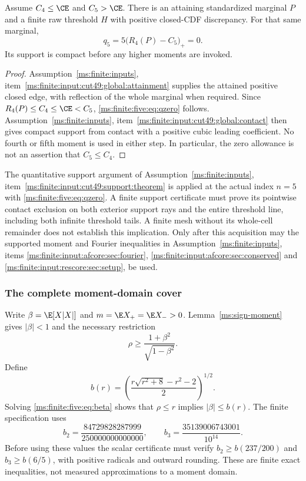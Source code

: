 \begin{lemma}\label{ms:finite:five:lem:qzero}
Assume $C_4\le\CE$ and $C_5>\CE$. There is an attaining standardized
marginal $P$ and a finite raw threshold $H$ with positive closed-CDF
discrepancy. For that same marginal,
\begin{equation}\label{ms:finite:five:eq:qzero}
 q_5=5\bigl(R_4(P)-C_5\bigr)_+=0.
\end{equation}
Its support is compact before any higher moments are invoked.
\end{lemma}
\begin{proof}
Assumption~\ref{ms:finite:inputs}, item~\ref{ms:finite:input:cut49:global:attainment} supplies the attained positive closed
edge, with reflection of the whole marginal when required. Since
$R_4(P)\le C_4\le\CE<C_5$, \eqref{ms:finite:five:eq:qzero} follows.
Assumption~\ref{ms:finite:inputs}, item~\ref{ms:finite:input:cut49:global:contact} then gives compact support from contact
with a positive cubic leading coefficient. No fourth or fifth moment is
used in either step. In particular, the zero allowance is not an
assertion that $C_5\le C_4$.
\end{proof}

The quantitative support argument of
Assumption~\ref{ms:finite:inputs}, item~\ref{ms:finite:input:cut49:support:theorem} is applied at the actual index $n=5$
with \eqref{ms:finite:five:eq:qzero}. A finite support certificate must prove its
pointwise contact exclusion on both exterior support rays and the entire
threshold line, including both infinite threshold tails. A finite mesh
without its whole-cell remainder does not establish this implication.
Only after this acquisition may the supported moment and Fourier
inequalities in Assumption~\ref{ms:finite:inputs}, items
\ref{ms:finite:input:afcore:sec:fourier},
\ref{ms:finite:input:afcore:sec:conserved} and
\ref{ms:finite:input:rescore:sec:setup}, be used.

\subsubsection{The complete moment-domain cover}\label{ms:finite:five:sec:cover}

Write $\beta=\E[X|X|]$ and $m=\E X_+=\E X_->0$.
Lemma~\ref{ms:sign-moment} gives $|\beta|<1$ and the necessary restriction
\begin{equation}\label{ms:finite:five:eq:beta}
 \rho\ge\frac{1+\beta^2}{\sqrt{1-\beta^2}}.
\end{equation}
Define
\[
 b(r)=\left(\frac{r\sqrt{r^2+8}-r^2-2}{2}\right)^{1/2}.
\]
Solving \eqref{ms:finite:five:eq:beta} shows that $\rho\le r$ implies
$|\beta|\le b(r)$. The finite specification uses
\begin{equation}\label{ms:finite:five:eq:benclosures}
 b_2=\frac{84729828287999}{250000000000000},\qquad
 b_3=\frac{35139006743001}{10^{14}}.
\end{equation}
Before using these values the scalar certificate must verify
$b_2\ge b(237/200)$ and $b_3\ge b(6/5)$, with positive radicals
and outward rounding. These are finite exact inequalities, not measured
approximations to a moment domain.

